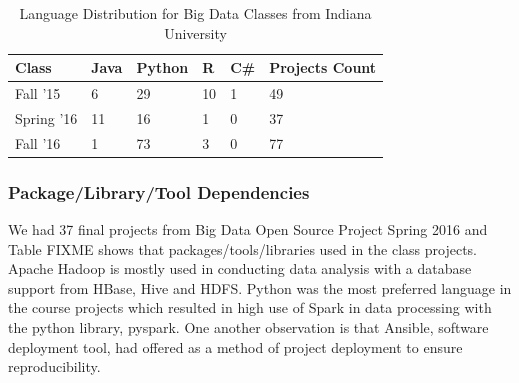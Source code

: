 \documentclass[9pt,twocolumn,twoside]{styles/osajnl}
\begin{document}
\begin{table}[htb]
  \begin{center}
    \begin{small}
      \begin{threeparttable}
        \begin{tabular}{l|l|l|l|l|l}

    Class      & Java & Python & R  & C\# & Projects Count \\ \hline \hline
    Fall '15   & 6    & 29     & 10 & 1   & 49             \\ \hline
    Spring '16 & 11   & 16     & 1  & 0   & 37             \\ \hline
    Fall '16   & 1    & 73     & 3  & 0   & 77             \\ 

        \end{tabular}
        \caption{Language Distribution for Big Data Classes from Indiana University}
        \label{tab:lang-dist-iu}
      \end{threeparttable}
    \end{small}
  \end{center}
\end{table}


\subsubsection{Package/Library/Tool Dependencies}

We had 37 final projects from Big Data Open Source Project Spring 2016
and Table FIXME shows that packages/tools/libraries used in the class
projects. Apache Hadoop is mostly used in conducting data analysis
with a database support from HBase, Hive and HDFS. Python was the most
preferred language in the course projects which resulted in high use
of Spark in data processing with the python library, pyspark. One
another observation is that Ansible, software deployment tool, had
offered as a method of project deployment to ensure reproducibility.
\end{document}
